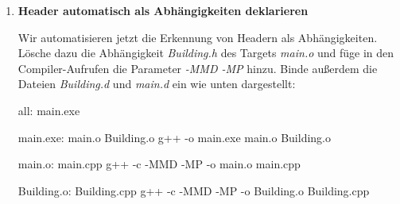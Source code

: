 \documentclass[
  accentcolor=tud1c,	%
  colorbacktitle,		%
  inverttitle,			%
  german,				%
  twoside
]{tudexercise}
\begin{document}
\begin{enumerate}
Bewege \emph{toString} nun nach \emph{Buidling.h}:
\begin{lstlisting}
#include <sstream>
// ...
inline const std::string toString() const{

    std::stringstream output;
    output << "A building with " << this->numFloors << " floors\n";
    return output.str();
}
\end{lstlisting}

Baue das Projekt; es kompiliert nicht! Warum? Genau aus dem Grund, dass \emph{make} das Header-File nicht \glqq kennt\grqq{}.
Jetzt gibt es im Projekt keine Definition von \emph{toString} wie uns der Linker auch mitteilt:
\begin{verbatim}
main.o:main.cpp:(.text+0x5c): undefined reference to `Building::toString() const'
collect2: ld returned 1 exit status
\end{verbatim}

Das Problem lässt sich lösen, indem wir im Makefile angeben, dass \emph{main.o} nicht nur abhängig von \emph{Building.cpp}, sondern auch von \emph{Building.h} ist:
\begin{lstmake}
# ...
main.o: main.cpp Building.h
	g++ -c -o main.o main.cpp
# ...
\end{lstmake}

Ist das eine schöne Lösung?
Sicherlich nicht, denn ab sofort müssten wir manuell alle Header ins Makefile eintragen, die wir per \emph{\#include} in eine Sourcedatei einbinden.
Schlimmer noch: Wir müssten über rekursive Includes Bescheid wissen, z.B. wenn \emph{Building.h} einen anderen veränderlichen Header wie \emph{Floor.h} einbindet.

Glücklicherweise hilft uns \emph{g++} bei diesem Problem.

\item\textbf{Header automatisch als Abhängigkeiten deklarieren}

Wir automatisieren jetzt die Erkennung von Headern als Abhängigkeiten.
Lösche dazu die Abhängigkeit \emph{Building.h} des Targets \emph{main.o} und füge in den Compiler-Aufrufen die Parameter \emph{-MMD -MP} hinzu.
Binde außerdem die Dateien \emph{Building.d} und \emph{main.d} ein wie unten dargestellt:
\begin{lstmake}
all: main.exe

main.exe: main.o Building.o
	g++ -o main.exe main.o Building.o

main.o: main.cpp
	g++ -c -MMD -MP -o main.o main.cpp

Building.o: Building.cpp
	g++ -c -MMD -MP -o Building.o Building.cpp


\end{lstmake}
\end{enumerate}
\end{document}
